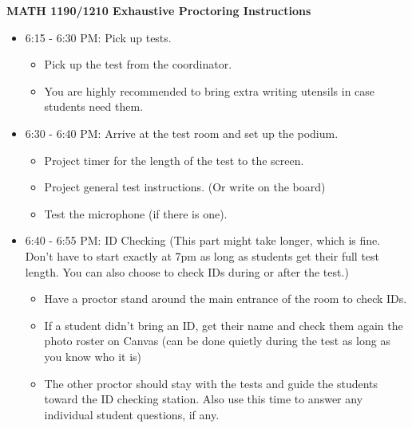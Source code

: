 \documentclass[11pt]{article}
\begin{document}
{\Large\bf MATH 1190/1210 Exhaustive Proctoring Instructions}

\begin{itemize}
\item 6:15 - 6:30 PM: Pick up tests.
\begin{itemize}
    \item Pick up the test from the coordinator. 
    \item You are highly recommended to bring extra writing utensils in case students need them.
\end{itemize}
\item 6:30 - 6:40 PM: Arrive at the test room and set up the podium.
\begin{itemize}
    \item Project timer for the length of the test to the screen.
    \item Project general test instructions. (Or write on the board)
    \item Test the microphone (if there is one).
\end{itemize}

\item 6:40 - 6:55 PM: ID Checking (This part might take longer, which is fine. Don't have to start exactly at 7pm as long as students get their full test length. You can also choose to check IDs during or after the test.)
    \begin{itemize}
    \item Have a proctor stand around the main entrance of the room to check IDs. 
    \item If a student didn't bring an ID, get their name and check them again the photo roster on Canvas (can be done quietly during the test as long as you know who it is)
    \item The other proctor should stay with the tests and guide the students toward the ID checking station. Also use this time to answer any individual student questions, if any.
    

\end{itemize}
\end{itemize}
\end{document}
